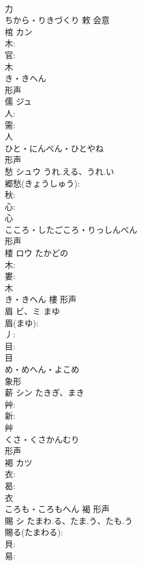 \documentclass[8pt]{extreport}
\begin{document}
\begin{CJK}{UTF8}{min}
\\	力	
\\	ちから・りきづくり	敕	会意 
\\	棺	カン			
\\	木: 
\\	官: 
\\	木	
\\	き・きへん	
\\	形声 
\\	儒	ジュ			
\\	人: 
\\	需: 
\\	人	
\\	ひと・にんべん・ひとやね	
\\	形声 
\\	愁	シュウ	うれ.える、うれ.い		
\\	郷愁(きょうしゅう): 
\\	秋: 
\\	心: 
\\	心	
\\	こころ・したごころ・りっしんべん	
\\	形声 
\\	楼	ロウ	たかどの		
\\	木: 
\\	婁: 
\\	木	
\\	き・きへん	樓	形声 
\\	眉	ビ、ミ	まゆ		
\\	眉(まゆ): 
\\	丿: 
\\	目: 
\\	目	
\\	め・めへん・よこめ	
\\	象形 
\\	薪	シン	たきぎ、まき		
\\	艸: 
\\	新: 
\\	艸	
\\	くさ・くさかんむり	
\\	形声 
\\	褐	カツ			
\\	衣: 
\\	曷: 
\\	衣	
\\	ころも・ころもへん	褐	形声 
\\	賜	シ	たまわ.る、たま.う、たも.う		
\\	賜る(たまわる): 
\\	貝: 
\\	易: 

\end{CJK}
\end{document}
